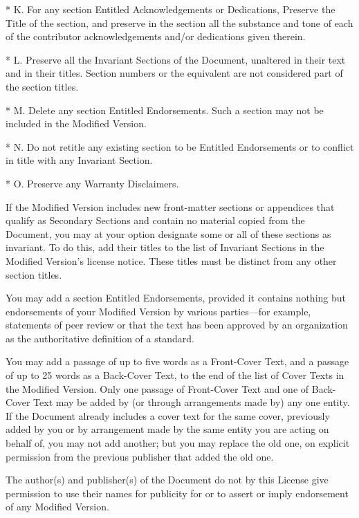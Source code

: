 \begin{BookLicense}
* K. For any section Entitled \BookQuoteChar{}Acknowledgements\BookQuoteChar{} or \BookQuoteChar{}Dedications\BookQuoteChar{}, Preserve the Title of the section, and preserve in the section all the substance and tone of each of the contributor acknowledgements and/or dedications given therein.

* L. Preserve all the Invariant Sections of the Document, unaltered in their text and in their titles. Section numbers or the equivalent are not considered part of the section titles.

* M. Delete any section Entitled \BookQuoteChar{}Endorsements\BookQuoteChar{}. Such a section may not be included in the Modified Version.

* N. Do not retitle any existing section to be Entitled \BookQuoteChar{}Endorsements\BookQuoteChar{} or to conflict in title with any Invariant Section.

* O. Preserve any Warranty Disclaimers.

If the Modified Version includes new front-matter sections or appendices that qualify as Secondary Sections and contain no material copied from the Document, you may at your option designate some or all of these sections as invariant. To do this, add their titles to the list of Invariant Sections in the Modified Version's license notice. These titles must be distinct from any other section titles.

You may add a section Entitled \BookQuoteChar{}Endorsements\BookQuoteChar{}, provided it contains nothing but endorsements of your Modified Version by various parties—for example, statements of peer review or that the text has been approved by an organization as the authoritative definition of a standard.

You may add a passage of up to five words as a Front-Cover Text, and a passage of up to 25 words as a Back-Cover Text, to the end of the list of Cover Texts in the Modified Version. Only one passage of Front-Cover Text and one of Back-Cover Text may be added by (or through arrangements made by) any one entity. If the Document already includes a cover text for the same cover, previously added by you or by arrangement made by the same entity you are acting on behalf of, you may not add another; but you may replace the old one, on explicit permission from the previous publisher that added the old one.

The author(s) and publisher(s) of the Document do not by this License give permission to use their names for publicity for or to assert or imply endorsement of any Modified Version.


\end{BookLicense}
